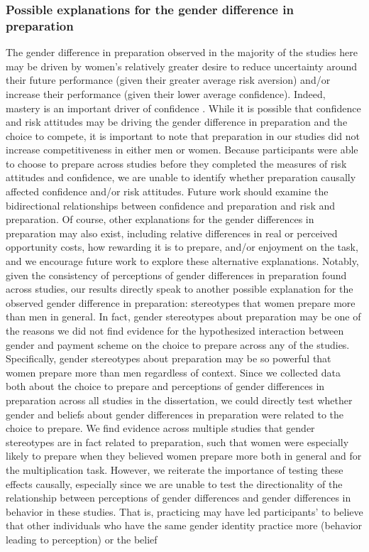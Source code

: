 \documentclass[letterpaper, nobind]{templates/ociamthesis}
\begin{document}
\hypertarget{possible-explanations-for-the-gender-difference-in-preparation}{%
\subsubsection{Possible explanations for the gender difference in preparation}\label{possible-explanations-for-the-gender-difference-in-preparation}}

The gender difference in preparation observed in the majority of the studies here may be driven by women's relatively greater desire to reduce uncertainty around their future performance (given their greater average risk aversion) and/or increase their performance (given their lower average confidence). Indeed, mastery is an important driver of confidence \autocites[for review, see][]{Gist1992,Usher2008}. While it is possible that confidence and risk attitudes may be driving the gender difference in preparation and the choice to compete, it is important to note that preparation in our studies did not increase competitiveness in either men or women. Because participants were able to choose to prepare across studies before they completed the measures of risk attitudes and confidence, we are unable to identify whether preparation causally affected confidence and/or risk attitudes. Future work should examine the bidirectional relationships between confidence and preparation and risk and preparation. Of course, other explanations for the gender differences in preparation may also exist, including relative differences in real or perceived opportunity costs, how rewarding it is to prepare, and/or enjoyment on the task, and we encourage future work to explore these alternative explanations. Notably, given the consistency of perceptions of gender differences in preparation found across studies, our results directly speak to another possible explanation for the observed gender difference in preparation: stereotypes that women prepare more than men in general. In fact, gender stereotypes about preparation may be one of the reasons we did not find evidence for the hypothesized interaction between gender and payment scheme on the choice to prepare across any of the studies. Specifically, gender stereotypes about preparation may be so powerful that women prepare more than men regardless of context. Since we collected data both about the choice to prepare and perceptions of gender differences in preparation across all studies in the dissertation, we could directly test whether gender and beliefs about gender differences in preparation were related to the choice to prepare. We find evidence across multiple studies that gender stereotypes are in fact related to preparation, such that women were especially likely to prepare when they believed women prepare more both in general and for the multiplication task. However, we reiterate the importance of testing these effects causally, especially since we are unable to test the directionality of the relationship between perceptions of gender differences and gender differences in behavior in these studies. That is, practicing may have led participants' to believe that other individuals who have the same gender identity practice more (behavior leading to perception) or the belief 
\end{document}
